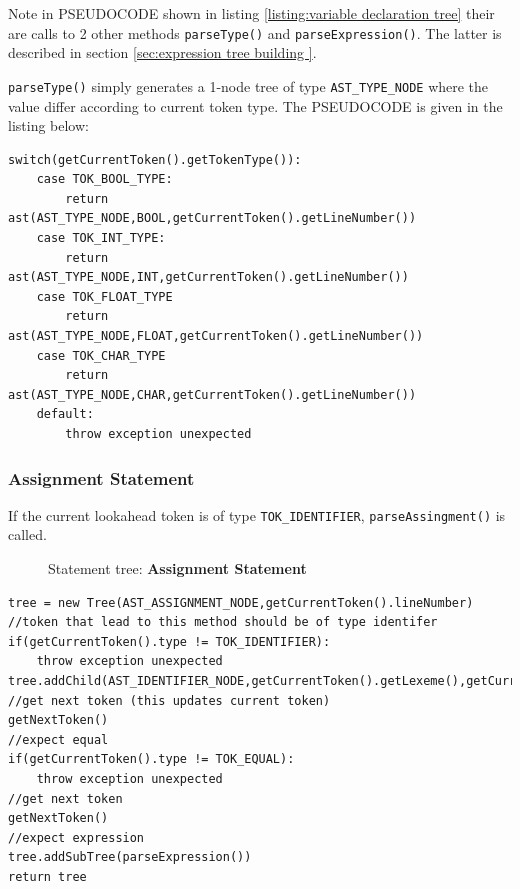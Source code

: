 Note in PSEUDOCODE shown in listing \ref{listing:variable declaration tree} their are calls to 2 other methods \verb!parseType()! and \verb!parseExpression()!. The latter is described in section \ref{sec:expression tree building }.


\verb!parseType()! simply generates a 1-node tree of type \verb!AST_TYPE_NODE! where the value differ according to current token type. The PSEUDOCODE is given in the listing below:
\begin{lstlisting}[caption={PSUEDOCODE for building a 1-node AST\_TYPE\_NODE tree (\emph{parseType()})},label=listing:type tree]
switch(getCurrentToken().getTokenType()):
    case TOK_BOOL_TYPE:
        return ast(AST_TYPE_NODE,BOOL,getCurrentToken().getLineNumber())
    case TOK_INT_TYPE:
        return ast(AST_TYPE_NODE,INT,getCurrentToken().getLineNumber())
    case TOK_FLOAT_TYPE
        return ast(AST_TYPE_NODE,FLOAT,getCurrentToken().getLineNumber())
    case TOK_CHAR_TYPE
        return ast(AST_TYPE_NODE,CHAR,getCurrentToken().getLineNumber())
    default:
        throw exception unexpected
\end{lstlisting}
\subsubsection{Assignment Statement}
\label{sec:assignment statement tree}
If the current lookahead token is of type \verb!TOK_IDENTIFIER!, \verb!parseAssingment()! is called. 
\begin{figure}[H]
    \centering
    \caption{Statement tree: \textbf{Assignment Statement}}
    \label{fig:assignment tree}
\end{figure}
\begin{lstlisting}[caption=PSEUDOCODE for building an assignment tree (\emph{parseAssignment()})]
tree = new Tree(AST_ASSIGNMENT_NODE,getCurrentToken().lineNumber)
//token that lead to this method should be of type identifer
if(getCurrentToken().type != TOK_IDENTIFIER):
    throw exception unexpected 
tree.addChild(AST_IDENTIFIER_NODE,getCurrentToken().getLexeme(),getCurrentToken().getLineNumber())
//get next token (this updates current token)
getNextToken()
//expect equal 
if(getCurrentToken().type != TOK_EQUAL):
    throw exception unexpected 
//get next token 
getNextToken()
//expect expression
tree.addSubTree(parseExpression())
return tree
\end{lstlisting}
